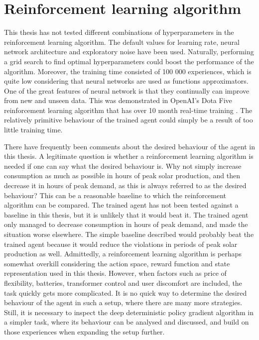 \documentclass[class=book, crop=false, 11pt]{standalone}
\begin{document}
\section{Reinforcement learning algorithm}
This thesis has not tested different combinations of hyperparameters in the reinforcement learning algorithm. The default values for learning rate, neural network architecture and exploratory noise have been used. Naturally, performing a grid search to find optimal hyperparameters could boost the performance of the algorithm. Moreover, the training time consisted of 100 000 experiences, which is quite low considering that neural networks are used as functions approximators. One of the great features of neural network is that they continually can improve from new and unseen data. This was demonstrated in OpenAI's Dota Five reinforcement learning algorithm that has over 10 month real-time training \cite{openai_dota}. The relatively primitive behaviour of the trained agent could simply be a result of too little training time.

There have frequently been comments about the desired behaviour of the agent in this thesis. A legitimate question is whether a reinforcement learning algorithm is needed if one can say what the desired behaviour is. Why not simply increase consumption as much as possible in hours of peak solar production, and then decrease it in hours of peak demand, as this is always referred to as the desired behaviour? This can be a reasonable baseline to which the reinforcement algorithm can be compared. The trained agent has not been tested against a baseline in this thesis, but it is unlikely that it would beat it. The trained agent only managed to decrease consumption in hours of peak demand, and made the situation worse elsewhere. The simple baseline described would probably beat the trained agent because it would reduce the violations in periods of peak solar production as well. Admittedly, a reinforcement learning algorithm is perhaps somewhat overkill considering the action space, reward function and state representation used in this thesis. However, when factors such as price of flexibility, batteries, transformer control and user discomfort are included, the task quickly gets more complicated. It is no quick way to determine the desired behaviour of the agent in such a setup, where there are many more strategies. Still, it is necessary to inspect the deep deterministic policy gradient algorithm in a simpler task, where its behaviour can be analysed and discussed, and build on those experiences when expanding the setup further. 
\end{document}
